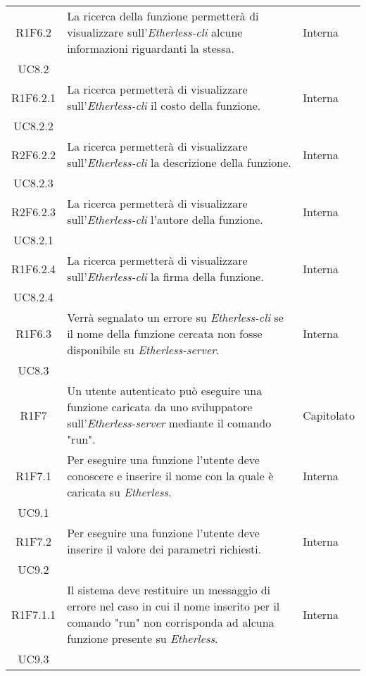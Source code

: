 \begin{longtable}{|c|p{8cm}|C{2cm}|}
	R1F6.2 &  La ricerca della funzione permetterà di visualizzare sull'\textit{Etherless-cli} alcune informazioni riguardanti la stessa.  & \centering Interna \\ UC8.2 \tabularnewline
	
	R1F6.2.1 &  La ricerca permetterà di visualizzare sull'\textit{Etherless-cli} il costo della funzione.  & \centering Interna \\ UC8.2.2 \tabularnewline

	R2F6.2.2 &  La ricerca permetterà di visualizzare sull'\textit{Etherless-cli} la descrizione della funzione.  & \centering Interna \\ UC8.2.3 \tabularnewline	
	
	R2F6.2.3 &  La ricerca permetterà di visualizzare sull'\textit{Etherless-cli} l'autore della funzione.  & \centering Interna \\ UC8.2.1 \tabularnewline
	
	R1F6.2.4 &  La ricerca permetterà di visualizzare sull'\textit{Etherless-cli} la firma della funzione.  & \centering Interna \\ UC8.2.4 \tabularnewline
	
	R1F6.3 &  Verrà segnalato un errore su \textit{Etherless-cli} se il nome della funzione cercata non fosse disponibile su \textit{Etherless-server}.  & \centering Interna \\ UC8.3 \tabularnewline
	
	R1F7 &  Un utente autenticato può eseguire una funzione caricata da uno sviluppatore sull'\textit{Etherless-server} mediante il comando "run".  & Capitolato \\
	
	R1F7.1 &  Per eseguire una funzione l'utente deve conoscere e inserire il nome con la quale è caricata su \textit{Etherless}.  & \centering Interna \\ UC9.1 \tabularnewline
	
	R1F7.2 &  Per eseguire una funzione l'utente deve inserire il valore dei parametri richiesti.  & \centering Interna \\ UC9.2 \tabularnewline

	R1F7.1.1 &  Il sistema deve restituire un messaggio di errore nel caso in cui il nome inserito per il comando "run" non corrisponda ad alcuna funzione presente su \textit{Etherless}.  & \centering Interna \\ UC9.3 \tabularnewline
	

\end{longtable}
